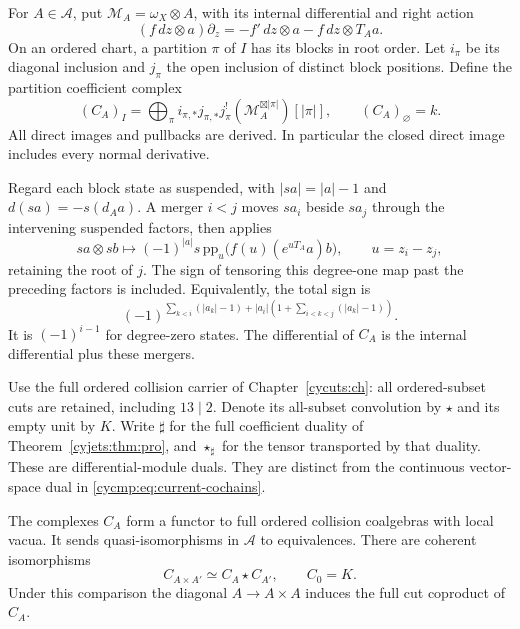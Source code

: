 For $A\in\mathcal A$, put $\mathscr M_A=\omega_X\otimes A$,
with its internal differential and right action
\begin{equation}\label{cycmp:eq:right-current}
 (f\,dz\otimes a)\partial_z
       =-f'\,dz\otimes a-f\,dz\otimes T_Aa.
\end{equation}
On an ordered chart, a partition $\pi$ of $I$ has its blocks
in root order. Let $i_\pi$ be its diagonal inclusion and $j_\pi$
the open inclusion of distinct block positions. Define the
partition coefficient complex
\begin{equation}\label{cycmp:eq:regular-coefficient}
 (C_A)_I=
 \bigoplus_\pi i_{\pi,*}j_{\pi,*}j_\pi^!
                  (\mathscr M_A^{\boxtimes|\pi|})[|\pi|],
 \qquad (C_A)_\varnothing=k.
\end{equation}
All direct images and pullbacks are derived. In particular the closed
direct image includes every normal derivative.

Regard each block state as suspended, with $|sa|=|a|-1$ and
$d(sa)=-s(d_Aa)$. A merger $i<j$ moves $sa_i$ beside $sa_j$
through the intervening suspended factors, then applies
\begin{equation}\label{cycmp:eq:regular-residue}
 sa\otimes sb\longmapsto
    (-1)^{|a|}s\,\mathrm{pp}_u\bigl(f(u)(e^{uT_A}a)b\bigr),
 \qquad u=z_i-z_j,
\end{equation}
retaining the root of $j$. The sign of tensoring this degree-one
map past the preceding factors is included. Equivalently, the total
sign is
\[
 (-1)^{\sum_{k<i}(|a_k|-1)+
       |a_i|(1+\sum_{i<k<j}(|a_k|-1))}.
\]
It is $(-1)^{i-1}$ for degree-zero states. The differential of
$C_A$ is the internal differential plus these mergers.

Use the full ordered collision carrier of
Chapter~\ref{cycuts:ch}: all ordered-subset cuts are retained,
including $13\mid2$. Denote its all-subset convolution by $\star$
and its empty unit by $K$. Write $\sharp$ for the full coefficient
duality of Theorem~\ref{cyjets:thm:pro}, and $\star_\sharp$ for
the tensor transported by that duality. These are differential-module
duals. They are distinct from the continuous vector-space dual in
\eqref{cycmp:eq:current-cochains}.

\begin{proposition}\label{cycmp:prop:regular-coefficients}
The complexes $C_A$ form a functor to full ordered collision
coalgebras with local vacua. It sends quasi-isomorphisms in
$\mathcal A$ to equivalences. There are coherent isomorphisms
\begin{equation}\label{cycmp:eq:colored-coefficients}
 C_{A\times A'}\simeq C_A\star C_{A'},\qquad C_0=K.
\end{equation}
Under this comparison the diagonal $A\to A\times A$ induces
the full cut coproduct of $C_A$.
\end{proposition}

